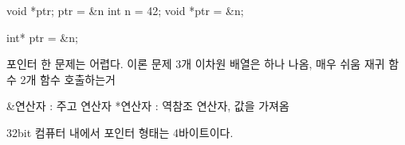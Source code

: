 void *ptr;
ptr = &n
int n = 42;
void *ptr = &n;  %

int* ptr = &n;  %

포인터 한 문제는 어렵다.
이론 문제 3개
이차원 배열은 하나 나옴, 매우 쉬움
재귀 함수 2개
함수 호출하는거

&연산자 : 주고 연산자 
*연산자 : 역참조 연산자, 값을 가져옴

32bit 컴퓨터 내에서 포인터 형태는 4바이트이다.
